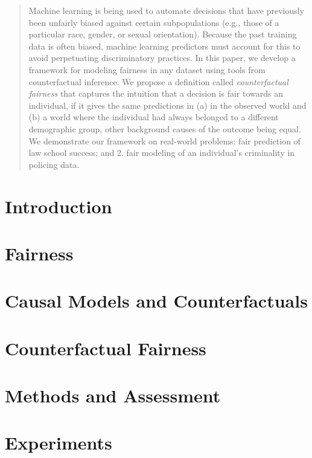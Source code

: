 \documentclass{article}
\begin{document}
\begin{abstract} 
  Machine learning is being used to
  automate decisions that have previously been unfairly biased
  against certain subpopulations (e.g., those of a particular race,
  gender, or sexual orientation).  Because the past training data is often
  biased, machine learning predictors must account for this to avoid perpetuating
  discriminatory practices.  In this paper, we develop a
  framework for modeling fairness in any dataset using tools from
  counterfactual inference. We propose a definition called
  \emph{counterfactual fairness} that captures the intuition
  that a decision is fair towards an individual, if it gives the same
  predictions in (a) in the observed world and (b) a world where the
  individual had always belonged to a different demographic group,
  other background causes of the outcome being equal. We demonstrate
  our framework on real-world problems:  fair
  prediction of law school success; and 2. fair modeling of an
  individual's criminality in policing data.
\end{abstract} 

\section{Introduction}
\label{introduction}


\section{Fairness}
\label{sec:related}


\section{Causal Models and Counterfactuals}
\label{background}


\section{Counterfactual Fairness}
\label{sec:count_fair}



\section{Methods and Assessment}
\label{sec:methods}


\section{Experiments}
\label{sec:experiments}

\end{document}

